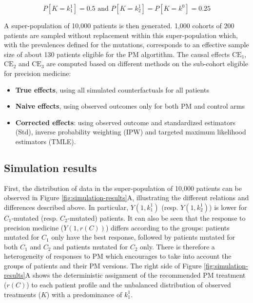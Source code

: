 \documentclass[a4paper,12pt,twoside,onecolumn,openright,final,oldfontcommands]{memoir}
\providecommand{\tightlist}{%
  \setlength{\itemsep}{0pt}\setlength{\parskip}{0pt}}
\begin{document}
\[P[K=k^1_1]=0.5 \text{ and } P[K=k^1_2]=P[K=k^0]=0.25\]

A super-population of 10,000 patients is then generated. 1,000 cohorts
of 200 patients are sampled without replacement within this
super-population which, with the prevalences defined for the mutations,
corresponds to an effective sample size of about 130 patients eligible
for the PM algortithm. The causal effects \(\text{CE}_1\),
\(\text{CE}_2\) and \(\text{CE}_3\) are computed based on different
methods on the sub-cohort eligible for precision medicine:

\begin{itemize}
\tightlist
\item
  \textbf{True effects}, using all simulated counterfactuals for all
  patients
\item
  \textbf{Naive effects}, using observed outcomes only for both PM and
  control arms
\item
  \textbf{Corrected effects}: using observed outcome and standardized
  estimators (Std), inverse probability weighting (IPW) and targeted
  maximum likelihood estimators (TMLE).
\end{itemize}

\subsection{Simulation results}\label{simulation-results}

First, the distribution of data in the super-population of 10,000
patients can be observed in Figure \ref{fig:simulation-results}A,
illustrating the different relations and differences described above. In
particular, \(Y(1, k^1_1)\) (resp. \(Y(1, k^1_2)\)) is lower for
\(C_1\)-mutated (resp. \(C_2\)-mutated) patients. It can also be seen
that the response to precision medicine (\(Y(1, r(C))\)) differs
according to the groups: patients mutated for \(C_1\) only have the best
response, followed by patients mutated for both \(C_1\) and \(C_2\) and
patients mutated for \(C_2\) only. There is therefore a heterogeneity of
responses to PM which encourages to take into account the groups of
patients and their PM versions. The right side of Figure
\ref{fig:simulation-results}A shows the deterministic assignment of the
recommended PM treatment (\(r(C)\)) to each patient profile and the
unbalanced distribution of observed treatments (\(K\)) with a
predominance of \(k^1_1\).
\end{document}
